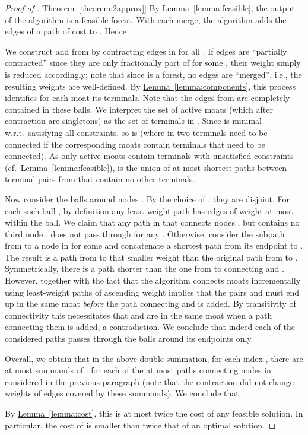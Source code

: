 \documentclass[letterpaper,11pt]{article}
\newcommand{\namedref}[2]{\hyperref[#2]{#1~\ref*{#2}}}
\newcommand{\theoremref}[1]{\namedref{Theorem}{#1}}
\newcommand{\lemmaref}[1]{\namedref{Lemma}{#1}}
\begin{document}
\begin{proof}[Proof of \theoremref{theorem:2approx}]
By \lemmaref{lemma:feasible}, the output  of the algorithm is a feasible
forest. With each merge, the algorithm adds the edges of a path of cost
 to . Hence


We construct  and  from  by contracting edges in
 for all . If edges are ``partially
contracted'' since they are only fractionally part of
 for some , their weight simply is
reduced accordingly; note that since  is a forest, no edges are ``merged'',
i.e., the resulting weights are well-defined. By \lemmaref{lemma:components},
this process identifies for each moat  its terminals. Note that
the edges from  are completely contained in these balls. We interpret
the set of active moats  (which after
contraction are singletons) as the set of terminals in . Since  is
minimal w.r.t.\ satisfying all constraints, so is  (where in  two
terminals need to be connected if the corresponding moats contain terminals
that need to be connected). As only active moats contain terminals with
unsatisfied constraints (cf.~\lemmaref{lemma:feasible}),  is the union of at
most  shortest paths between terminal pairs from  that
contain no other terminals.

Now consider the balls  around nodes . By the choice
of , they are disjoint. For each such ball , by
definition any least-weight path has edges of weight at most  within the
ball. We claim that any path in  that connects nodes , but
contains no third node , does not pass through
 for any . Otherwise, consider the subpath from 
to a node in  for some  and
concatenate a shortest path from its endpoint to . The result is a path
from  to  that smaller weight than the original path from  to .
Symmetrically, there is a path shorter than the one from  to  connecting
 and . However, together with the fact that the algorithm connects moats
incrementally using least-weight paths of ascending weight implies that the
pairs  and  must end up in the same moat \emph{before} the
path connecting  and  is added. By transitivity of connectivity this
necessitates that  and  are in the same moat when a path connecting them
is added, a contradiction. We conclude that indeed each of the considered paths
passes through the balls around its endpoints only.

Overall, we obtain that in the above double summation, for each index , there
are at most  summands of :  for each of the at
most  paths connecting nodes in  considered in the previous
paragraph (note that the contraction did not change weights of edges covered by
these summands). We conclude that

By \lemmaref{lemma:cost}, this is at most twice the cost of any feasible
solution. In particular, the cost of  is smaller than twice that of an
optimal solution.
\end{proof}
\end{document}
